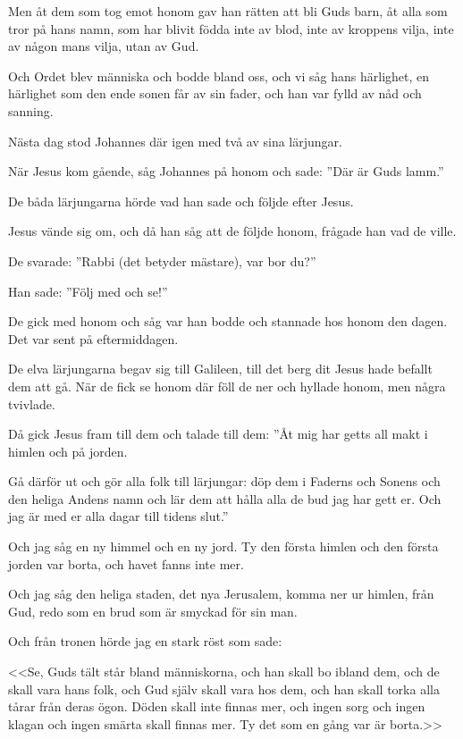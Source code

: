 Men åt dem som tog emot honom gav han rätten att bli Guds barn, åt alla som tror på hans namn, 
som har blivit födda inte av blod, inte av kroppens vilja, inte av någon mans vilja, utan av Gud.

Och Ordet blev människa och bodde bland oss, och vi såg hans härlighet, en härlighet som den ende sonen får av sin fader, och han var fylld av nåd och sanning.

{Nästa dag stod Johannes där igen med två av sina lärjungar.}

När Jesus kom gående, såg Johannes på honom och sade: ''Där är Guds lamm.'' 

De båda lärjungarna hörde vad han sade och följde efter Jesus. 

Jesus vände sig om, och då han såg att de följde honom, frågade han vad de ville. 

De svarade: ''Rabbi (det betyder mästare), var bor du?'' 

Han sade: ''Följ med och se!''

 De gick med honom och såg var han bodde och stannade hos honom den dagen. Det var sent på eftermiddagen.

\newpage

{
De elva lärjungarna begav sig till Galileen, till det berg dit Jesus hade befallt dem att gå.} 
När de fick se honom där föll de ner och hyllade honom, men några tvivlade. 

Då gick Jesus fram till dem och talade till dem: ''Åt mig har getts all makt i himlen och på jorden. 

Gå därför ut och gör alla folk till lärjungar: döp dem i Faderns och Sonens och den heliga Andens namn och lär dem att hålla alla de bud jag har gett er. Och jag är med er alla dagar till tidens slut.''


{
Och jag såg en ny himmel och en ny jord.} Ty den första himlen och den första jorden var borta, och havet fanns inte mer. 

Och jag såg den heliga staden, det nya Jerusalem, komma ner ur himlen, från Gud, redo som en brud som är smyckad för sin man. 

Och från tronen hörde jag en stark röst som sade: 

<<Se, Guds tält står bland människorna, och han skall bo ibland dem, och de skall vara hans folk, och Gud själv skall vara hos dem, 
och han skall torka alla tårar från deras ögon. Döden skall inte finnas mer, och ingen sorg och ingen klagan och ingen smärta skall finnas mer. Ty det som en gång var är borta.>>


